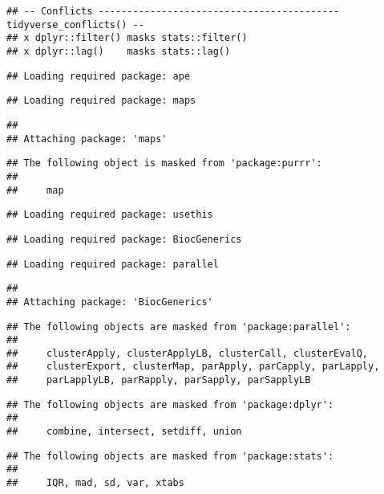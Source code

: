 \documentclass[]{article}
\begin{document}
\begin{verbatim}
## -- Conflicts ------------------------------------------ tidyverse_conflicts() --
## x dplyr::filter() masks stats::filter()
## x dplyr::lag()    masks stats::lag()
\end{verbatim}

\begin{verbatim}
## Loading required package: ape
\end{verbatim}

\begin{verbatim}
## Loading required package: maps
\end{verbatim}

\begin{verbatim}
## 
## Attaching package: 'maps'
\end{verbatim}

\begin{verbatim}
## The following object is masked from 'package:purrr':
## 
##     map
\end{verbatim}

\begin{verbatim}
## Loading required package: usethis
\end{verbatim}

\begin{verbatim}
## Loading required package: BiocGenerics
\end{verbatim}

\begin{verbatim}
## Loading required package: parallel
\end{verbatim}

\begin{verbatim}
## 
## Attaching package: 'BiocGenerics'
\end{verbatim}

\begin{verbatim}
## The following objects are masked from 'package:parallel':
## 
##     clusterApply, clusterApplyLB, clusterCall, clusterEvalQ,
##     clusterExport, clusterMap, parApply, parCapply, parLapply,
##     parLapplyLB, parRapply, parSapply, parSapplyLB
\end{verbatim}

\begin{verbatim}
## The following objects are masked from 'package:dplyr':
## 
##     combine, intersect, setdiff, union
\end{verbatim}

\begin{verbatim}
## The following objects are masked from 'package:stats':
## 
##     IQR, mad, sd, var, xtabs
\end{verbatim}
\end{document}
